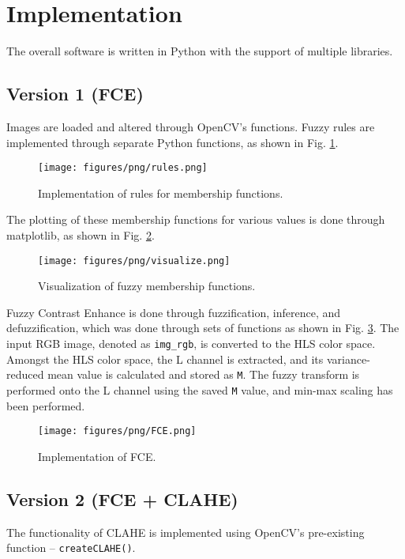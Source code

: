 \section{Implementation}
\label{sec:implementation}
The overall software is written in Python with the support of multiple libraries.

\subsection{Version 1 (FCE)}
Images are loaded and altered through OpenCV’s functions. Fuzzy rules are implemented through separate Python functions, as shown in Fig. \ref{fig:rules}.

\begin{figure}[h]
    \centering
    \texttt{[image: figures/png/rules.png]}
    \caption{Implementation of rules for membership functions.}
    \label{fig:rules}
\end{figure}

The plotting of these membership functions for various values is done through matplotlib, as shown in Fig. \ref{fig:visusalization}.

\begin{figure}[h]
    \centering
    \texttt{[image: figures/png/visualize.png]}
    \caption{Visualization of fuzzy membership functions.}
    \label{fig:visusalization}
\end{figure}

Fuzzy Contrast Enhance is done through fuzzification, inference, and defuzzification, which was done through sets of functions as shown in Fig. \ref{fig:FCE}. The input RGB image, denoted as \texttt{img\_rgb}, is converted to the HLS color space. Amongst the HLS color space, the L channel is extracted, and its variance-reduced mean value is calculated and stored as \texttt{M}. The fuzzy transform is performed onto the L channel using the saved \texttt{M} value, and min-max scaling has been performed.

\begin{figure}[h]
    \centering
    \texttt{[image: figures/png/FCE.png]}
    \caption{Implementation of FCE.}
    \label{fig:FCE}
\end{figure}

\subsection{Version 2 (FCE + CLAHE)}
The functionality of CLAHE is implemented using OpenCV’s pre-existing function – \texttt{createCLAHE()}.


